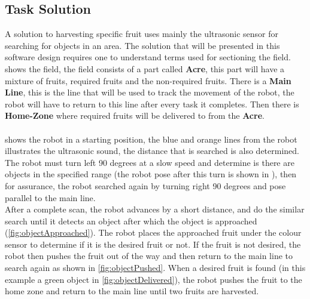 \subsection{Task Solution}\label{sectaskSolution}
\noindent A solution to harvesting specific fruit uses mainly the ultrasonic sensor for searching for objects in an area. The solution that will be presented in this software design requires one to understand terms used for sectioning the field.   shows the field, the field consists of a part called \textbf{Acre}, this part will have a mixture of fruits, required fruits and the non-required fruits. There is a \textbf{Main Line}, this is the line that will be used to track the movement of the robot, the robot will have to return to this line after every task it completes. Then there is \textbf{Home-Zone} where required fruits will be delivered to from the \textbf{Acre}.\\
~\\
\noindent {} shows the robot in a starting position, the blue and orange lines from the robot illustrates the ultrasonic sound, the distance that is searched is also determined. The robot must turn left 90 degrees at a slow speed and determine is there are objects in the specified range (the robot pose after this turn is shown in ), then for assurance, the robot searched again by turning right 90 degrees and pose parallel to the main line.\\
\noindent After a complete scan, the robot advances by a short distance, and do the similar search until it detects an object after which the object is approached (\vref{fig:objectApproached}). The robot places the approached fruit under the colour sensor to determine if it is the desired fruit or not. If the fruit is not desired, the robot then pushes the fruit out of the way and then return to the main line to search again as shown in \vref{fig:objectPushed}. When a desired fruit is found (in this example a green object in \vref{fig:objectDelivered}), the robot pushes the fruit to the home zone and return to the main line until two fruits are harvested.
